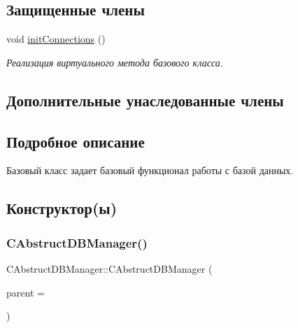 \subsection*{Защищенные члены}
\begin{DoxyCompactItemize}
\item 
\hypertarget{class_c_abstruct_d_b_manager_ad450c557df6d9a7dfcc4a37082f35659}{}\label{class_c_abstruct_d_b_manager_ad450c557df6d9a7dfcc4a37082f35659} 
void \hyperlink{class_c_abstruct_d_b_manager_ad450c557df6d9a7dfcc4a37082f35659}{init\+Connections} ()
\begin{DoxyCompactList}\small\item\em Реализация виртуального метода базового класса. \end{DoxyCompactList}\end{DoxyCompactItemize}
\subsection*{Дополнительные унаследованные члены}


\subsection{Подробное описание}
Базовый класс задает базовый функционал работы с базой данных. 

\subsection{Конструктор(ы)}
\hypertarget{class_c_abstruct_d_b_manager_a53c2018cfa7a1a24bacd747967509bd7}{}\label{class_c_abstruct_d_b_manager_a53c2018cfa7a1a24bacd747967509bd7} 
\subsubsection{\texorpdfstring{C\+Abstruct\+D\+B\+Manager()}{CAbstructDBManager()}}
{\footnotesize\ttfamily C\+Abstruct\+D\+B\+Manager\+::\+C\+Abstruct\+D\+B\+Manager (\begin{DoxyParamCaption}\item[{Q\+Object $\ast$}]{parent = {} }\end{DoxyParamCaption})\hspace{0.3cm}{\ttfamily [explicit]}}



